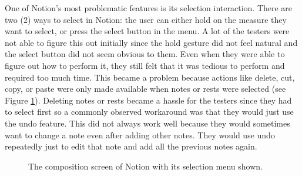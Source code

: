 			One of Notion's most problematic features is its selection interaction. There are two (2) ways to select in Notion: the user can either hold on the measure they want to select, or press the select button in the menu. A lot of the testers were not able to figure this out initially since the hold gesture did not feel natural and the select button did not seem obvious to them. Even when they were able to figure out how to perform it, they still felt that it was tedious to perform and required too much time. This became a problem because actions like delete, cut, copy, or paste were only made available when notes or rests were selected (see Figure \ref{fig:notion_delete}). Deleting notes or rests became a hassle for the testers since they had to select first so a commonly observed workaround was that they would just use the undo feature. This did not always work well because they would sometimes want to change a note even after adding other notes. They would use undo repeatedly just to edit that note and add all the previous notes again. 

			\begin{figure}[H]
				\centering
			    \caption{The composition screen of Notion with its selection menu shown.}
			    \label{fig:notion_delete}
			\end{figure} 

